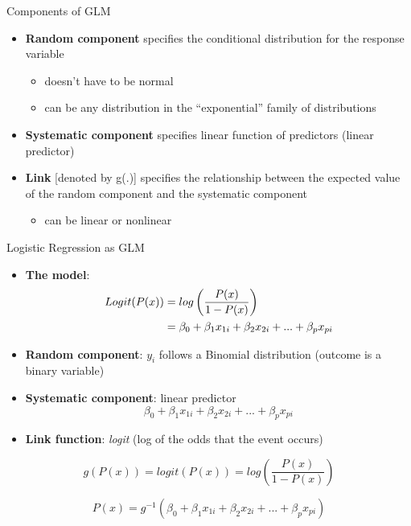 \documentclass[
  ignorenonframetext,
]{beamer}
\providecommand{\tightlist}{%
  \setlength{\itemsep}{0pt}\setlength{\parskip}{0pt}}
\begin{document}
\begin{frame}{Components of GLM}
\protect\hypertarget{components-of-glm}{}

\begin{itemize}
\tightlist
\item
  \textbf{Random component} specifies the conditional distribution for
  the response variable

  \begin{itemize}
  \tightlist
  \item
    doesn't have to be normal
  \item
    can be any distribution in the ``exponential'' family of
    distributions
  \end{itemize}
\item
  \textbf{Systematic component} specifies linear function of predictors
  (linear predictor)
\item
  \textbf{Link} {[}denoted by g(.){]} specifies the relationship between
  the expected value of the random component and the systematic
  component

  \begin{itemize}
  \tightlist
  \item
    can be linear or nonlinear
  \end{itemize}
\end{itemize}

\end{frame}

\begin{frame}{Logistic Regression as GLM}
\protect\hypertarget{logistic-regression-as-glm}{}

\begin{itemize}
\item
  \textbf{The model}: \[
  \begin{aligned}
  Logit(P(x)) &= log \left( \frac{P(x)}{1-P(x)} \right) \notag\\
   &= \beta_0 + \beta_1 x_{1i} + \beta_2 x_{2i} + ... + \beta_p x_{pi} \notag
  \end{aligned}
  \]
\item
  \textbf{Random component}: \(y_i\) follows a Binomial distribution
  (outcome is a binary variable)
\item
  \textbf{Systematic component}: linear predictor \[
  \beta_0 + \beta_1 x_{1i} + \beta_2 x_{2i} + ... + \beta_p x_{pi}
  \]
\item
  \textbf{Link function}: \emph{logit} (log of the odds that the event
  occurs)
\end{itemize}

\[
g(P(x)) = logit(P(x)) = log\left( \frac{P(x)}{1-P(x)} \right)
\]

\[
P(x) = g^{-1}\left( \beta_0 + \beta_1 x_{1i} + \beta_2 x_{2i} + ... + \beta_p x_{pi}
 \right)
\]

\end{frame}
\end{document}
